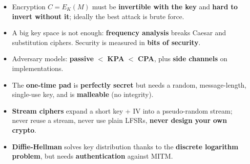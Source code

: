 \begin{keybox}[title=Summary]
\begin{itemize}
  \item Encryption $C = E_K(M)$ must be \textbf{invertible with the key} and \textbf{hard
        to invert without it}; ideally the best attack is brute force.
  \item A big key space is not enough: \textbf{frequency analysis} breaks Caesar and
        substitution ciphers. Security is measured in \textbf{bits of security}.
  \item Adversary models: \textbf{passive} $<$ \textbf{KPA} $<$ \textbf{CPA}, plus
        \textbf{side channels} on implementations.
  \item The \textbf{one-time pad} is \textbf{perfectly secret} but needs a random,
        message-length, single-use key, and is \textbf{malleable} (no integrity).
  \item \textbf{Stream ciphers} expand a short key + IV into a pseudo-random stream;
        never reuse a stream, never use plain LFSRs, \textbf{never design your own
        crypto}.
  \item \textbf{Diffie-Hellman} solves key distribution thanks to the \textbf{discrete
        logarithm problem}, but needs \textbf{authentication} against MITM.
\end{itemize}
\end{keybox}
